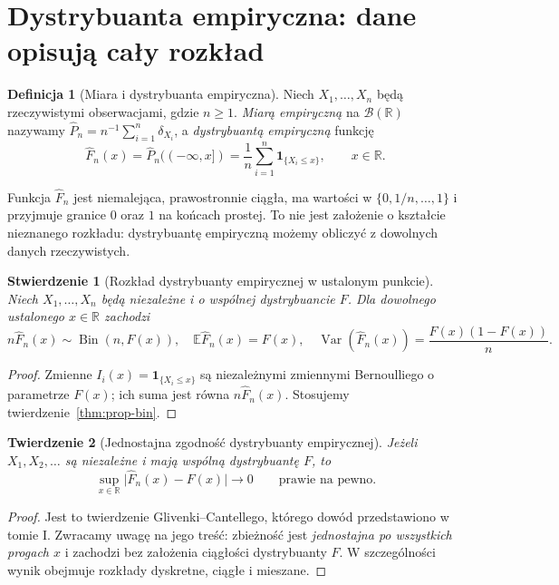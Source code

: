 \documentclass[11pt,a4paper,oneside]{report}
\numberwithin{equation}{chapter}
\theoremstyle{plain}
\newtheorem{twierdzenie}{Twierdzenie}[chapter]
\newtheorem{stwierdzenie}[twierdzenie]{Stwierdzenie}
\theoremstyle{definition}
\newtheorem{definicja}{Definicja}[chapter]
\theoremstyle{remark}
\newcommand{\R}{\mathbb R}
\newcommand{\E}{\mathbb E}
\newcommand{\Var}{\operatorname{Var}}
\newcommand{\calB}{\mathcal B}
\newcommand{\ind}[1]{\mathbf 1_{#1}}
\newcommand{\abs}[1]{\lvert#1\rvert}
\DeclareMathOperator{\Bin}{Bin}
\begin{document}
\section{Dystrybuanta empiryczna: dane opisują cały rozkład}\label{sec:ecdf}
\begin{definicja}[Miara i dystrybuanta empiryczna]
Niech $X_1,\ldots,X_n$ będą rzeczywistymi obserwacjami, gdzie $n\ge1$. \emph{Miarą empiryczną} na $\calB(\R)$ nazywamy
$\widehat P_n=n^{-1}\sum_{i=1}^n\delta_{X_i}$, a \emph{dystrybuantą empiryczną} funkcję
\[
\widehat F_n(x)=\widehat P_n(( -\infty,x])=\frac1n\sum_{i=1}^n\ind{\{X_i\le x\}},\qquad x\in\R.
\]
\end{definicja}

Funkcja $\widehat F_n$ jest niemalejąca, prawostronnie ciągła, ma wartości w $\{0,1/n,\ldots,1\}$ i przyjmuje granice $0$ oraz $1$ na końcach prostej. To nie jest założenie o kształcie nieznanego rozkładu: dystrybuantę empiryczną możemy obliczyć z dowolnych danych rzeczywistych.

\begin{stwierdzenie}[Rozkład dystrybuanty empirycznej w ustalonym punkcie]\label{prop:ecdf-pointwise}
Niech $X_1,\ldots,X_n$ będą niezależne i o wspólnej dystrybuancie $F$. Dla dowolnego ustalonego $x\in\R$ zachodzi
\[
n\widehat F_n(x)\sim\Bin(n,F(x)),\quad
\E\widehat F_n(x)=F(x),\quad
\Var(\widehat F_n(x))=\frac{F(x)(1-F(x))}{n}.
\]
\end{stwierdzenie}
\begin{proof}
Zmienne $I_i(x)=\ind{\{X_i\le x\}}$ są niezależnymi zmiennymi Bernoulliego o parametrze $F(x)$; ich suma jest równa $n\widehat F_n(x)$. Stosujemy twierdzenie~\ref{thm:prop-bin}.
\end{proof}

\begin{twierdzenie}[Jednostajna zgodność dystrybuanty empirycznej]\label{thm:gc}
Jeżeli $X_1,X_2,\ldots$ są niezależne i mają wspólną dystrybuantę $F$, to
\[
\sup_{x\in\R}\abs{\widehat F_n(x)-F(x)}\longrightarrow0
\qquad\text{prawie na pewno}.
\]
\end{twierdzenie}
\begin{proof}
Jest to twierdzenie Glivenki--Cantellego, którego dowód przedstawiono w tomie I. Zwracamy uwagę na jego treść: zbieżność jest \emph{jednostajna po wszystkich progach $x$} i zachodzi bez założenia ciągłości dystrybuanty $F$. W szczególności wynik obejmuje rozkłady dyskretne, ciągłe i mieszane.
\end{proof}
\end{document}
